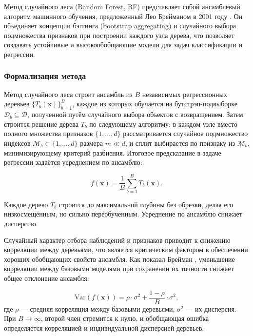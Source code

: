 Метод случайного леса (Random Forest, RF) представляет собой ансамблевый алгоритм машинного обучения, предложенный Лео Брейманом в 2001 году \cite{Breiman2001}. Он объединяет концепции бэггинга (bootstrap aggregating) и случайного выбора подмножества признаков при построении каждого узла дерева, что позволяет создавать устойчивые и высокообобщающие модели для задач классификации и регрессии.

\subsubsection{Формализация метода}

Метод случайного леса строит ансамбль из $B$ независимых регрессионных деревьев $\{T_b(\mathbf{x})\}_{b=1}^B$, каждое из которых обучается на бутстрэп-подвыборке $\mathcal{D}_b \subseteq \mathcal{D}$, полученной путём случайного выбора объектов с возвращением. Затем строится решение дерева $T_b$ по следующему алгоритму: в каждом узле вместо полного множества признаков $\{1, \dots, d\}$ рассматривается случайное подмножество индексов $\mathcal{M}_b \subset \{1, \dots, d\}$ размера $m \ll d$, и сплит выбирается по признаку из $\mathcal{M}_b$, минимизирующему критерий разбиения. Итоговое предсказание в задаче регрессии задаётся усреднением по ансамблю:

\begin{equation}
f(\mathbf{x}) = \frac{1}{B} \sum_{b=1}^B T_b(\mathbf{x}).
\end{equation}

Каждое дерево $T_b$ строится до максимальной глубины без обрезки, делая его низкосмещённым, но сильно переобученным. Усреднение по ансамблю снижает дисперсию.

Случайный характер отбора наблюдений и признаков приводит к снижению корреляции между деревьями, что является критическим фактором в обеспечении хороших обобщающих свойств ансамбля. Как показал Брейман \cite{Breiman2001}, уменьшение корреляции между базовыми моделями при сохранении их точности снижает общее отклонение ансамбля:

\begin{equation}
\text{Var}(f(\mathbf{x})) = \rho \cdot \sigma^2 + \frac{1 - \rho}{B} \cdot \sigma^2,
\end{equation}
где $\rho$ — средняя корреляция между базовыми деревьями, $\sigma^2$ — их дисперсия. При $B \to \infty$, второй член стремится к нулю, и обобщающая ошибка определяется корреляцией и индивидуальной дисперсией деревьев.

